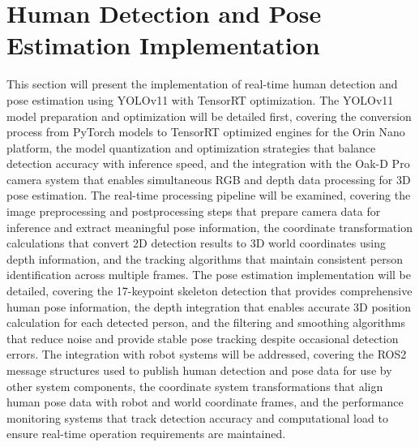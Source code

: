 \section{Human Detection and Pose Estimation Implementation}
This section will present the implementation of real-time human detection and pose estimation using YOLOv11 with TensorRT optimization. The YOLOv11 model preparation and optimization will be detailed first, covering the conversion process from PyTorch models to TensorRT optimized engines for the Orin Nano platform, the model quantization and optimization strategies that balance detection accuracy with inference speed, and the integration with the Oak-D Pro camera system that enables simultaneous RGB and depth data processing for 3D pose estimation. The real-time processing pipeline will be examined, covering the image preprocessing and postprocessing steps that prepare camera data for inference and extract meaningful pose information, the coordinate transformation calculations that convert 2D detection results to 3D world coordinates using depth information, and the tracking algorithms that maintain consistent person identification across multiple frames. The pose estimation implementation will be detailed, covering the 17-keypoint skeleton detection that provides comprehensive human pose information, the depth integration that enables accurate 3D position calculation for each detected person, and the filtering and smoothing algorithms that reduce noise and provide stable pose tracking despite occasional detection errors. The integration with robot systems will be addressed, covering the ROS2 message structures used to publish human detection and pose data for use by other system components, the coordinate system transformations that align human pose data with robot and world coordinate frames, and the performance monitoring systems that track detection accuracy and computational load to ensure real-time operation requirements are maintained.

